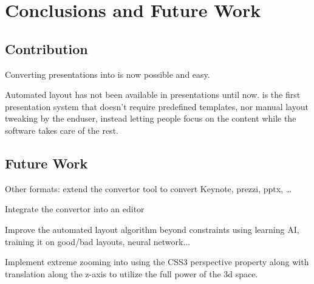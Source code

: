 
 \chapter{Conclusions and Future Work}


  \section{Contribution}


   Converting \ppt presentations into \mxp is now possible and easy.

   Automated layout has not been available in presentations until now. \mxp is
   the first presentation system that doesn't require predefined templates, nor
   manual layout tweaking by the enduser, instead letting people focus on the
   content while the software takes care of the rest.

  \section{Future Work}


   Other formats: extend the convertor tool to convert Keynote, prezzi, pptx,
   \ldots

   Integrate the convertor into an \mxp editor

   Improve the automated layout algorithm beyond constraints using learning AI,
   training it on good/bad layouts, neural network...

   Implement extreme zooming into \mxp using the CSS3 perspective property
   along with translation along the z-axis to utilize the full power of the 3d
   space.

